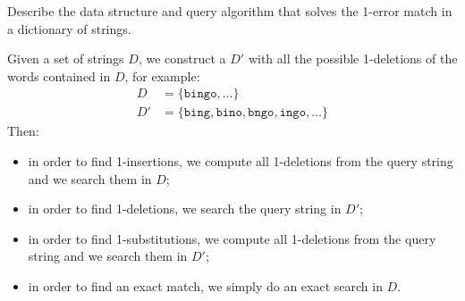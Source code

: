 \exercise

Describe the data structure and query algorithm that solves the 1-error match in
a dictionary of strings.

\solution

Given a set of strings $D$, we construct a $D'$ with all the possible
1-deletions of the words contained in $D$, for example:
%
\begin{align*}
  D &= \{ \texttt{bingo}, \dots \} \\
  D' &= \{ \texttt{bing}, \texttt{bino}, \texttt{bngo}, \texttt{ingo}, \dots \}
\end{align*}
%
Then:
%
\begin{itemize}

  \item in order to find 1-insertions, we compute all 1-deletions from the query
  string and we search them in $D$;

  \item in order to find 1-deletions, we search the query string in $D'$;

  \item in order to find 1-substitutions, we compute all 1-deletions from the
  query string and we search them in $D'$;

  \item in order to find an exact match, we simply do an exact search in $D$.

\end{itemize}
